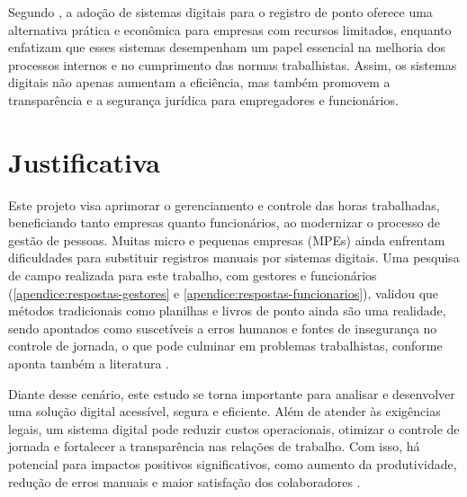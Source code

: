 Segundo \textcite{gomes2023}, a adoção de sistemas digitais para o registro de ponto oferece uma alternativa prática e econômica para empresas com recursos limitados, enquanto \textcite{mariotti2011} enfatizam que esses sistemas desempenham um papel essencial na melhoria dos processos internos e no cumprimento das normas trabalhistas. Assim, os sistemas digitais não apenas aumentam a eficiência, mas também promovem a transparência e a segurança jurídica para empregadores e funcionários.

\section{Justificativa}


Este projeto visa aprimorar o gerenciamento e controle das horas trabalhadas, beneficiando tanto empresas quanto funcionários, ao modernizar o processo de gestão de pessoas. Muitas micro e pequenas empresas (MPEs) ainda enfrentam dificuldades para substituir registros manuais por sistemas digitais. Uma pesquisa de campo realizada para este trabalho, com gestores e funcionários (\autoref{apendice:respostas-gestores} e \autoref{apendice:respostas-funcionarios}), validou que métodos tradicionais como planilhas e livros de ponto ainda são uma realidade, sendo apontados como suscetíveis a erros humanos e fontes de insegurança no controle de jornada, o que pode culminar em problemas trabalhistas, conforme aponta também a literatura \cite{FlorindoBianchi2022}.

Diante desse cenário, este estudo se torna importante para analisar e desenvolver uma solução digital acessível, segura e eficiente. Além de atender às exigências legais, um sistema digital pode reduzir custos operacionais, otimizar o controle de jornada e fortalecer a transparência nas relações de trabalho. Com isso, há potencial para impactos positivos significativos, como aumento da produtividade, redução de erros manuais e maior satisfação dos colaboradores \cite{gomes2023}.

